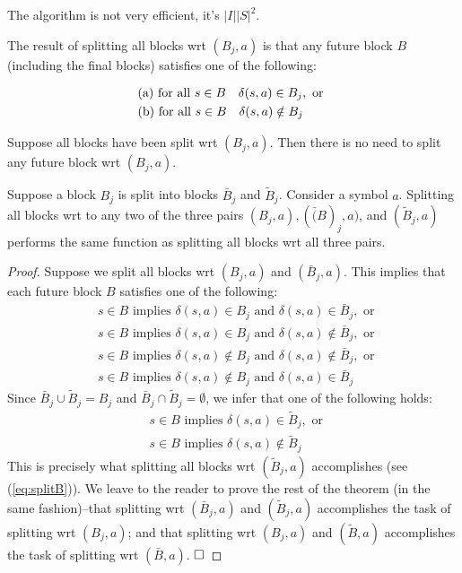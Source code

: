 The algorithm is not very efficient, it's $|I||S|^2$.

The result of splitting all blocks wrt $(B_j, a)$ is that any future block $B$ (including the final blocks) satisfies one of the following:

\begin{align}
&\text{(a) for all } s\in B\quad \delta(s,a)\in B_j, \text{ or } \label{eq:splitB} \\
&\text{(b) for all } s\in B\quad \delta(s,a)\notin B_j \notag %
\end{align}

\begin{lemma} 
	Suppose all blocks have been split wrt $(B_j, a)$. Then there is no need to split any future block wrt $(B_j, a)$.
\end{lemma}

\begin{lemma} \label{lem:three_pairs}
Suppose a block $B_j$ is split into blocks $\bar{B}_j$ and $\tilde{B}_j$. Consider a symbol $a$. Splitting all blocks wrt to any two of the three pairs $(B_j, a), (\bar(B)_j, a)$, and $(\tilde{B}_j, a)$ performs the same function as splitting all blocks wrt all three pairs.
\end{lemma}

\begin{proof}
	Suppose we split all blocks wrt $(B_j, a)$ and $(\bar{B}_j, a)$. This implies that each future block $B$ satisfies one of the following:
	\begin{align*}
    & s\in B \text{ implies } \delta(s,a)\in B_j \text{ and } \delta(s,a)\in \bar{B}_j, \text{ or } \\
    & s\in B \text{ implies } \delta(s,a)\in B_j \text{ and } \delta(s,a)\notin \bar{B}_j, \text{ or } \\
    & s\in B \text{ implies } \delta(s,a)\notin B_j \text{ and } \delta(s,a)\notin \bar{B}_j, \text{ or } \\
    & s\in B \text{ implies } \delta(s,a)\notin B_j \text{ and } \delta(s,a)\in \bar{B}_j
	\end{align*}
	Since $\bar{B}_j\cup\tilde{B}_j=B_j$ and $\bar{B}_j\cap\tilde{B}_j=\emptyset$, we infer that one of the following holds:
	\begin{align*}
	& s\in B \text{ implies } \delta(s,a)\in \tilde{B}_j, \text{ or } \\
	& s\in B \text{ implies } \delta(s,a)\notin \tilde{B}_j
	\end{align*}
	This is precisely what splitting all blocks wrt $(\tilde{B}_j,a)$ accomplishes (see (\ref{eq:splitB})). We leave to the reader to prove the rest of the theorem (in the same fashion)--that	splitting wrt $(\bar{B}_j,a)$ and $(\tilde{B}_j,a)$ accomplishes the task of splitting wrt $(B_j, a)$; and that splitting wrt $(B_j, a)$ and $(\tilde{B}, a)$ accomplishes the task of splitting wrt  $(\bar{B}, a)$. $\hfill\square$
\end{proof}

